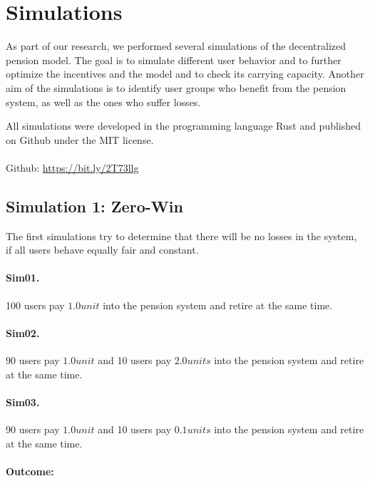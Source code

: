 \section{Simulations}

As part of our research, we performed several simulations of the decentralized pension model. The goal is to simulate different user behavior and to further optimize the incentives and the model and to check its carrying capacity. Another aim of the simulations is to identify user groups who benefit from the pension system, as well as the ones who suffer losses.

All simulations were developed in the programming language Rust and published on Github under the MIT license.\\
\\
Github: \url{https://bit.ly/2T73llg}

\subsection{Simulation 1: Zero-Win}

The first simulations try to determine that there will be no losses in the system, if all users behave equally fair and constant.

\paragraph{Sim01.} 100 users pay $1.0 unit$ into the pension system and retire at the same time.

\paragraph{Sim02.} 90 users pay $1.0 unit$ and 10 users pay $2.0 units$ into the pension system and retire at the same time.

\paragraph{Sim03.} 90 users pay $1.0 unit$ and 10 users pay $0.1 units$ into the pension system and retire at the same time.

\paragraph{Outcome:}

\begin{table}[hbt!]
\centering
{}
\end{table}

